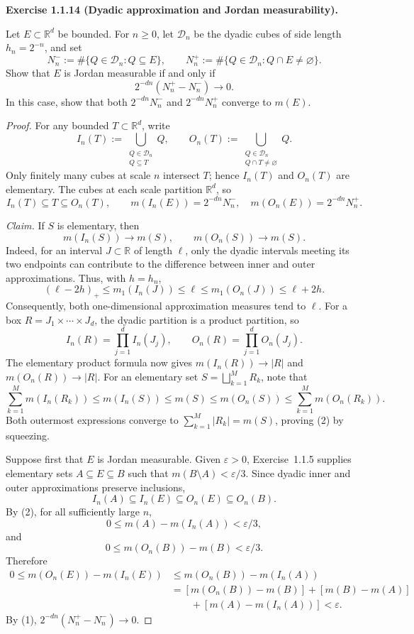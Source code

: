\noindent\textbf{Exercise 1.1.14 (Dyadic approximation and Jordan measurability).}\par
Let $E\subset\mathbb{R}^d$ be bounded. For $n\geq 0$, let
$\mathcal D_n$ be the dyadic cubes of side length $h_n=2^{-n}$,
and set
\[
N_n^-:=\#\{Q\in\mathcal D_n:Q\subseteq E\},\qquad
N_n^+:=\#\{Q\in\mathcal D_n:Q\cap E\neq\varnothing\}.
\]
Show that $E$ is Jordan measurable if and only if
\[
2^{-dn}(N_n^+-N_n^-)\longrightarrow0.
\]
In this case, show that both $2^{-dn}N_n^-$ and $2^{-dn}N_n^+$
converge to $m(E)$.

\begin{proof}
For any bounded $T\subset\mathbb R^d$, write
\[
I_n(T):=\bigcup_{\substack{Q\in\mathcal D_n\\Q\subseteq T}}Q,
\qquad
O_n(T):=\bigcup_{\substack{Q\in\mathcal D_n\\Q\cap T\neq\varnothing}}Q.
\]
Only finitely many cubes at scale $n$ intersect $T$; hence
$I_n(T)$ and $O_n(T)$ are elementary. The cubes at each scale
partition $\mathbb R^d$, so
\[
I_n(T)\subseteq T\subseteq O_n(T),\qquad
m(I_n(E))=2^{-dn}N_n^-,\quad m(O_n(E))=2^{-dn}N_n^+.
\tag{1}
\]

\emph{Claim.} If $S$ is elementary, then
\[
m(I_n(S))\longrightarrow m(S),\qquad
m(O_n(S))\longrightarrow m(S).
\tag{2}
\]
Indeed, for an interval $J\subset\mathbb R$ of length $\ell$,
only the dyadic intervals meeting its two endpoints can contribute
to the difference between inner and outer approximations. Thus,
with $h=h_n$,
\[
(\ell-2h)_+\leq m_1(I_n(J))\leq\ell
\leq m_1(O_n(J))\leq\ell+2h.
\]
Consequently, both one-dimensional approximation measures tend
to $\ell$. For a box $R=J_1\times\cdots\times J_d$, the dyadic
partition is a product partition, so
\[
I_n(R)=\prod_{j=1}^d I_n(J_j),\qquad
O_n(R)=\prod_{j=1}^d O_n(J_j).
\]
The elementary product formula now gives
$m(I_n(R))\to |R|$ and $m(O_n(R))\to |R|$.
For an elementary set $S=\bigsqcup_{k=1}^M R_k$, note that
\[
\sum_{k=1}^M m(I_n(R_k))\leq m(I_n(S))\leq m(S)
\leq m(O_n(S))\leq\sum_{k=1}^M m(O_n(R_k)).
\]
Both outermost expressions converge to
$\sum_{k=1}^M|R_k|=m(S)$, proving (2) by squeezing.

Suppose first that $E$ is Jordan measurable. Given
$\varepsilon>0$, Exercise~1.1.5 supplies elementary sets
$A\subseteq E\subseteq B$ such that
$m(B\setminus A)<\varepsilon/3$.
Since dyadic inner and outer approximations preserve inclusions,
\[
I_n(A)\subseteq I_n(E)\subseteq O_n(E)\subseteq O_n(B).
\]
By (2), for all sufficiently large $n$,
\[
0\leq m(A)-m(I_n(A))<\varepsilon/3,
\]
and
\[
0\leq m(O_n(B))-m(B)<\varepsilon/3.
\]
Therefore
\[
\begin{aligned}
0\leq m(O_n(E))-m(I_n(E))
&\leq m(O_n(B))-m(I_n(A))\\
&=[m(O_n(B))-m(B)]+[m(B)-m(A)]\\
&\qquad+[m(A)-m(I_n(A))] < \varepsilon.
\end{aligned}
\]
By (1), $2^{-dn}(N_n^+-N_n^-)\to0$.


\end{proof}
